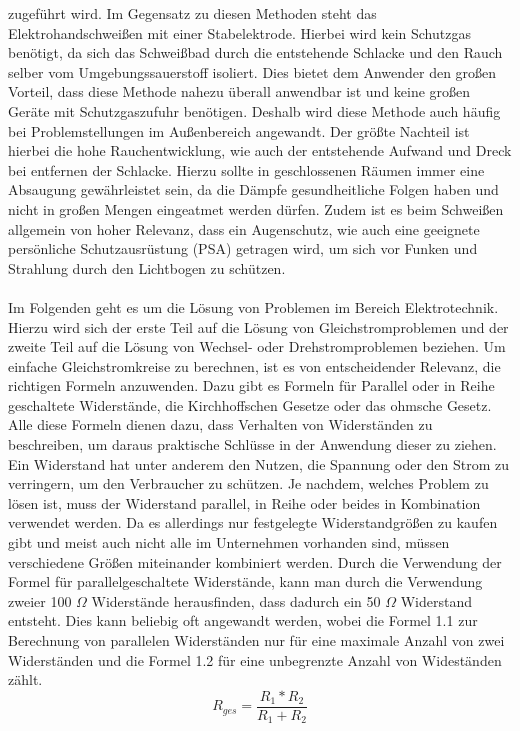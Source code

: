 zugeführt wird. Im Gegensatz zu diesen Methoden steht das Elektrohandschweißen mit einer Stabelektrode. Hierbei wird kein Schutzgas benötigt, da sich das 
Schweißbad durch die entstehende Schlacke und den Rauch selber vom Umgebungssauerstoff isoliert. Dies bietet dem Anwender den großen Vorteil, dass diese 
Methode nahezu überall anwendbar ist und keine großen Geräte mit Schutzgaszufuhr benötigen. Deshalb wird diese Methode auch häufig bei Problemstellungen 
im Außenbereich angewandt. Der größte Nachteil ist hierbei die hohe Rauchentwicklung, wie auch der entstehende Aufwand und Dreck bei entfernen der Schlacke. 
Hierzu sollte in geschlossenen Räumen immer eine Absaugung gewährleistet sein, da die Dämpfe gesundheitliche Folgen haben und nicht in großen Mengen 
eingeatmet werden dürfen. Zudem ist es beim Schweißen allgemein von hoher Relevanz, dass ein Augenschutz, wie auch eine geeignete persönliche 
Schutzausrüstung (PSA) getragen wird, um sich vor Funken und Strahlung durch den Lichtbogen zu schützen. \\\\ %
Im Folgenden geht es um die Lösung von Problemen im Bereich Elektrotechnik. Hierzu wird sich der erste Teil auf die Lösung von Gleichstromproblemen und der 
zweite Teil auf die Lösung von Wechsel- oder Drehstromproblemen beziehen. Um einfache Gleichstromkreise zu berechnen, ist es von entscheidender Relevanz, 
die richtigen Formeln anzuwenden. Dazu gibt es \zB Formeln für Parallel oder in Reihe geschaltete Widerstände, die Kirchhoffschen Gesetze oder das ohmsche 
Gesetz. Alle diese Formeln dienen dazu, dass Verhalten von Widerständen zu beschreiben, um daraus praktische Schlüsse in der Anwendung dieser zu ziehen. 
Ein Widerstand hat unter anderem den Nutzen, die Spannung oder den Strom zu verringern, um den Verbraucher zu schützen. Je nachdem, welches Problem zu 
lösen ist, muss der Widerstand parallel, in Reihe oder beides in Kombination verwendet werden. Da es allerdings nur festgelegte Widerstandgrößen zu kaufen 
gibt und meist auch nicht alle im Unternehmen vorhanden sind, müssen verschiedene Größen miteinander kombiniert werden. Durch die Verwendung der Formel für 
parallelgeschaltete Widerstände, kann man \zB durch die Verwendung zweier 100 $\Omega$ Widerstände herausfinden, dass dadurch ein 50 $\Omega$ Widerstand 
entsteht. Dies kann beliebig oft angewandt werden, wobei die Formel 1.1 zur Berechnung von parallelen Widerständen nur für eine maximale Anzahl von zwei 
Widerständen und die Formel 1.2 für eine unbegrenzte Anzahl von Wideständen zählt.
\begin{equation}
R_{ges}=\frac{R_1*R_2}{R_1+R_2}
\label{eqn:Parallelschaltung von 2 Widerständen}
\end{equation}
